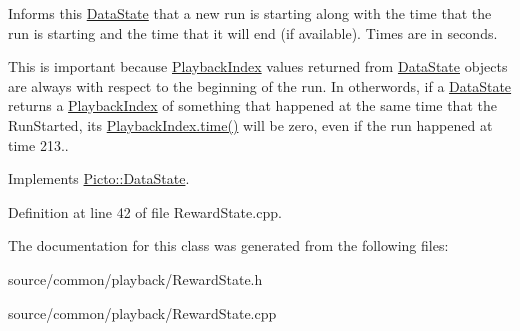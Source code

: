 Informs this \hyperlink{class_picto_1_1_data_state}{Data\-State} that a new run is starting along with the time that the run is starting and the time that it will end (if available). Times are in seconds. 

This is important because \hyperlink{struct_picto_1_1_playback_index}{Playback\-Index} values returned from \hyperlink{class_picto_1_1_data_state}{Data\-State} objects are always with respect to the beginning of the run. In otherwords, if a \hyperlink{class_picto_1_1_data_state}{Data\-State} returns a \hyperlink{struct_picto_1_1_playback_index}{Playback\-Index} of something that happened at the same time that the Run\-Started, its \hyperlink{struct_picto_1_1_playback_index_acbf8f826cfd64d647a098ed165dd3999}{Playback\-Index.\-time()} will be zero, even if the run happened at time 213.. 

Implements \hyperlink{class_picto_1_1_data_state_a8338a5e0c034ccd190e2916e4d60a6e8}{Picto\-::\-Data\-State}.



Definition at line 42 of file Reward\-State.\-cpp.



The documentation for this class was generated from the following files\-:\begin{DoxyCompactItemize}
\item 
source/common/playback/Reward\-State.\-h\item 
source/common/playback/Reward\-State.\-cpp\end{DoxyCompactItemize}
